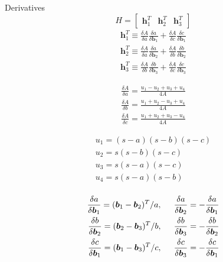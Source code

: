 \documentclass[12pt,a4paper,oneside]{article}
\begin{document}
Derivatives
\begin{equation}
H = \begin{bmatrix}
\bm{h}_1^T & \bm{h}_2^T & \bm{h}_3^T
\end{bmatrix}
\end{equation}
\begin{subequations}
\begin{align*}
\bm{h}_1^T \equiv \frac{\delta A}{\delta a}\frac{\delta a}{\delta\bm{b}_1} + \frac{\delta A}{\delta c}\frac{\delta c}{\delta\bm{b}_1} \\
\bm{h}_2^T \equiv \frac{\delta A}{\delta a}\frac{\delta a}{\delta\bm{b}_2} + \frac{\delta A}{\delta b}\frac{\delta b}{\delta\bm{b}_2}  \\
\bm{h}_3^T \equiv \frac{\delta A}{\delta b}\frac{\delta b}{\delta\bm{b}_3} + \frac{\delta A}{\delta c}\frac{\delta c}{\delta\bm{b}_3} 
\end{align*}
\end{subequations}

\begin{subequations}
\begin{align*}
\frac{\delta A}{\delta a} = \frac{u_1 - u_2 + u_3 + u_4}{4A} \\
\frac{\delta A}{\delta b} = \frac{u_1 + u_2 - u_3 + u_4}{4A} \\
\frac{\delta A}{\delta c} = \frac{u_1 + u_2 + u_3 - u_4}{4A}
\end{align*}
\end{subequations}

\begin{subequations}
\begin{align*}
u_1 = (s - a)(s - b)(s - c) \\
u_2 = s(s - b)(s - c) \\
u_3 = s(s - a)(s - c) \\
u_4 = s(s - a)(s - b) \\
\end{align*}
\end{subequations}

\begin{subequations}
\begin{align*}
\frac{\delta a}{\delta \bm{b}_1} = (\bm{b}_1 - \bm{b}_2)^T /a, \hspace{0.5cm} \frac{\delta a}{\delta \bm{b}_2} = -\frac{\delta a}{\delta \bm{b}_1} \\
\frac{\delta b}{\delta \bm{b}_2} = (\bm{b}_2 - \bm{b}_3)^T /b, \hspace{0.5cm} \frac{\delta b}{\delta \bm{b}_3} = -\frac{\delta b}{\delta \bm{b}_2} \\
\frac{\delta c}{\delta \bm{b}_1} = (\bm{b}_1 - \bm{b}_3)^T /c, \hspace{0.5cm} \frac{\delta c}{\delta \bm{b}_3} = -\frac{\delta c}{\delta \bm{b}_1}
\end{align*}
\end{subequations}
\end{document}
